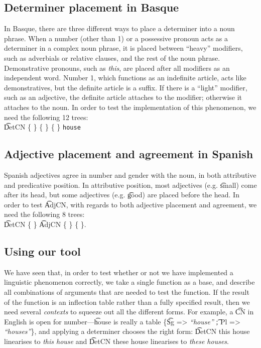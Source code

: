 \subsection{Determiner placement in Basque} In Basque, there are three
different ways to place a determiner into a noun phrase. When a number
(other than 1) or a possessive pronoun acts as a determiner in a
complex noun phrase, it is placed between ``heavy'' modifiers, such as
adverbials or relative clauses, and the rest of the noun
phrase. Demonstrative pronouns, such as \emph{this}, are placed after
all modifiers as an independent word. Number 1, which functions as an
indefinite article, acts like demonstratives, but the definite article
is a suffix. If there is a ``light'' modifier, such as an adjective,
the definite article attaches to the modifier; otherwise it attaches
to the noun. In order to test the implementation of this phenomenon,
we need the following 12 trees:  \\ 
\t{DetCN} \{
\} \{  \} 
\{  \}  {\tt house} 


\subsection{Adjective placement and agreement in Spanish}
Spanish adjectives agree in number and gender with the noun, in both
attributive and predicative position. In attributive position, most
adjectives (e.g. \t{small}) come after its head, but some adjectives
(e.g. \t{good}) are placed before the head. 
In order to test \t{AdjCN}, with regards to both adjective placement
and agreement, we need the following 8 trees: \\
\t{DetCN}  \{  \}
 \t{AdjCN} \{  \} 
           \{  \}.

\subsection{Using our tool} We have seen that, in order to test
whether or not we have implemented a linguistic phenomenon correctly,
we take a single function as a base, and describe all combinations of
arguments that are needed to test the function. If the result of the
function is an inflection table rather than a fully specified result,
then we need several \emph{contexts} to squeeze out all the different
forms. For example, a \t{CN} in English is open for number---\t{house}
is really a table \{\t{Sg =>} \emph{``house''} \t{; Pl =>}
\emph{``houses''}\}, and applying a determiner chooses the right form:
\t{DetCN this house} linearises to \emph{this house} and \t{DetCN
  these house} linearises to \emph{these houses}. 

